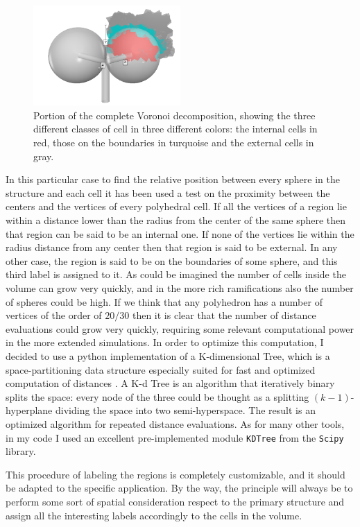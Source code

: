 \begin{description}
    \begin{figure}
        \centering
        \includegraphics[width = 0.5\textwidth]{images/cell_id}
        \caption{Portion of the complete Voronoi decomposition, showing the three different classes of cell in three different colors: the internal cells in red, those on the boundaries in turquoise and the external cells in gray.}
        \label{fig:cell_id}
    \end{figure}

    In this particular case to find the relative position between every sphere in the structure and each cell it has been used a test on the proximity between the centers and the vertices of every polyhedral cell. If all the vertices of a region lie within a distance lower than the radius from the center of the same sphere then that region can be said to be an internal one. If none of the vertices lie within the radius distance from any center then that region is said to be external. In any other case, the region is said to be on the boundaries of some sphere, and this third label is assigned to it. As could be imagined the number of cells inside the volume can grow very quickly, and in the more rich ramifications also the number of spheres could be high. If we think that any polyhedron has a number of vertices of the order of $20/30$ then it is clear that the number of distance evaluations could grow very quickly, requiring some relevant computational power in the more extended simulations. In order to optimize this computation, I decided to use a python implementation of a K-dimensional Tree, which is a space-partitioning data structure especially suited for fast and optimized computation of distances \cite{10.1145/361002.361007}. A K-d Tree is an algorithm that iteratively binary splits the space: every node of the three could be thought as a splitting $(k-1)$-hyperplane dividing the space into two semi-hyperspace. The result is an optimized algorithm for repeated distance evaluations. As for many other tools, in my code I used an excellent pre-implemented module \texttt{KDTree} from the \texttt{Scipy} library.

    This procedure of labeling the regions is completely customizable, and it should be adapted to the specific application. By the way, the principle will always be to perform some sort of spatial consideration respect to the primary structure and assign all the interesting labels accordingly to the cells in the volume.
\end{description}

